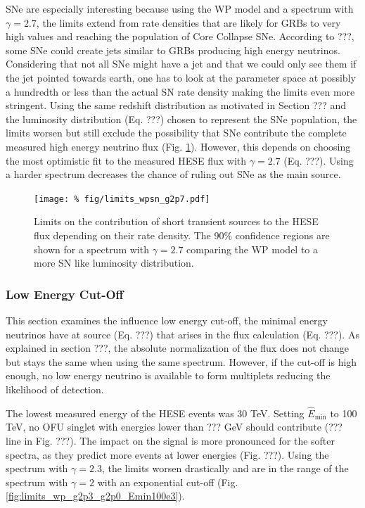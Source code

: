 SNe are especially interesting because using the WP model and a spectrum with 
$\gamma=2.7$, the limits extend from rate densities that are likely for GRBs to 
very high values and reaching the population of Core Collapse SNe. According to 
???, some SNe could create jets similar to GRBs producing high energy 
neutrinos. Considering that not all SNe might have a jet and that we could only 
see them if the jet pointed towards earth, one has to look at the parameter 
space at possibly a hundredth or less than the actual SN rate density making 
the limits even more stringent. Using the same redshift distribution as 
motivated in Section ??? and the luminosity distribution (Eq. ???) chosen to 
represent the SNe population, the limits worsen but still exclude the 
possibility that SNe contribute the complete measured high energy neutrino 
flux (Fig. \ref{fig:limits_wpsn_g2p7}). However, this depends on choosing the 
most optimistic fit to the measured HESE flux with $\gamma=2.7$ (Eq. ???). 
Using a harder spectrum decreases the chance of ruling out SNe as the main 
source.

\begin{figure}[h]
\centering
 \captionsetup{width=.9\textwidth}
\texttt{[image: \%
fig/limits\_wpsn\_g2p7.pdf]}
\caption{Limits on the contribution of short transient sources to the HESE 
flux depending on their rate density. The 90\% confidence regions are shown for 
a spectrum with $\gamma=2.7$ comparing the WP model to a more SN like 
luminosity distribution.}
\label{fig:limits_wpsn_g2p7}
\end{figure}

\subsubsection{Low Energy Cut-Off}
\label{sec:results_Emin}
This section examines the influence low energy cut-off, the minimal energy 
neutrinos have at source (Eq. ???) that arises in the flux calculation (Eq. 
???). As explained in section ???, the absolute normalization of the flux does 
not change but stays the same when using the same spectrum. However, if the 
cut-off is high enough, no low energy neutrino is available to form multiplets 
reducing the likelihood of detection. 

The lowest measured energy of the HESE events was 30 TeV. Setting 
$\hat{E}_\mathrm{min}$ to 100 TeV, no OFU singlet with energies lower than ??? 
GeV should contribute (??? line in Fig. ???). The impact on the signal is more 
pronounced for the softer spectra, as they predict more events at lower 
energies (Fig. ???). Using the spectrum with $\gamma=2.3$, the limits worsen 
drastically and are in the range of the spectrum with $\gamma=2$ with an 
exponential cut-off (Fig. \ref{fig:limits_wp_g2p3_g2p0_Emin100e3}). 

